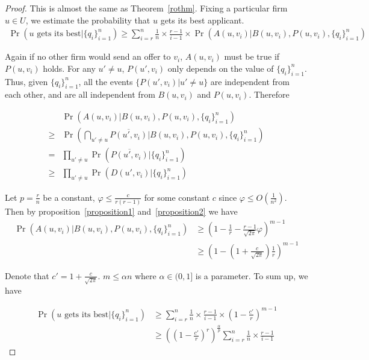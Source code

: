 \begin{proof}
This is almost the same as Theorem~\ref{rothm}.
Fixing a particular firm $u \in U$, we estimate the probability that $u$ gets
its best applicant.
\begin{align*}
    \Pr(u\text{ gets its best}|\{q_i\}_{i=1}^n) \ge \sum_{i=r}^{n} \frac{1}{n} \times \frac{r-1}{i-1}
                 \times \Pr(A(u, v_i) | B(u, v_i), P(u, v_i), \{q_i\}_{i=1}^n)
\end{align*}

Again if no other firm would send an offer to $v_i$, $A(u, v_i)$ must be true if $P(u, v_i)$ holds.
For any $u' \neq u$, $P(u', v_i)$ only depends on the value of $\{q_i\}_{i=1}^n$.
Thus, given $\{q_i\}_{i=1}^n$, all the events $\{P(u', v_i) | u' \neq u\}$ are independent from each other,
and are all independent from $B(u, v_i)$ and $P(u, v_i)$.
Therefore

\begin{align*}
    & \Pr(A(u, v_i) | B(u, v_i), P(u, v_i), \{q_i\}_{i=1}^n) \\
    \ge & \Pr(\bigcap_{u' \neq u}\overline{P(u', v_i)} | B(u, v_i), P(u, v_i), \{q_i\}_{i=1}^n) \\
    = & \prod_{u' \neq u} \Pr(\overline{P(u', v_i)} | \{q_i\}_{i=1}^n) \\
    \ge & \prod_{u' \neq u} \Pr(D(u', v_i) | \{q_i\}_{i=1}^n)
\end{align*}

Let $p = \frac{r}{n}$ be a constant, $\varphi \le \frac{c}{r(r-1)}$ for
some constant $c$ since $\varphi \le O(\frac{1}{n^2})$.
Then by proposition~\ref{proposition1} and~\ref{proposition2}
we have
\begin{align*}
\Pr(A(u, v_i) | B(u, v_i), P(u, v_i), \{q_i\}_{i=1}^n)
&\ge (1 - \frac{1}{r} - \frac{r - 1}{\sqrt{2\pi}}\varphi)^{m-1} \\
& \ge (1 - (1+\frac{c}{\sqrt{2\pi}})\frac{1}{r})^{m-1}
\end{align*}

Denote that $c' = 1 + \frac{c}{\sqrt{2\pi}}$.
$m \le \alpha n$ where $\alpha \in (0, 1]$ is a parameter.
To sum up, we have

\begin{align*}
    \Pr(u\text{ gets its best} | \{q_i\}_{i=1}^n)
    &\ge \sum_{i=r}^{n} \frac{1}{n} \times \frac{r-1}{i-1} \times (1 - \frac{c'}{r})^{m-1} \\
    &\ge ((1 - \frac{c'}{r})^{r})^{\frac{\alpha}{p}} \sum_{i=r}^{n} \frac{1}{n} \times \frac{r-1}{i-1}
\end{align*}


\end{proof}
